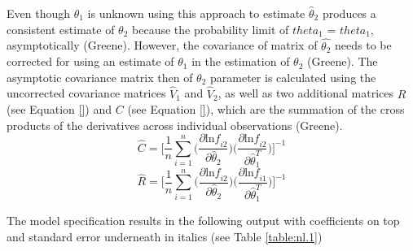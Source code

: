 \documentclass[10pt]{amsart}
\begin{document}
Even though $\theta_1$ is unknown using this approach to estimate $\hat{\theta}_2$ produces a consistent estimate of $\theta_2$ because the probability limit of $\hat{theta}_1$ = $theta_1$, asymptotically \parencite{}(Greene). 
However, the covariance of matrix of $\hat{\theta_2}$ needs to be corrected for using an estimate of $\theta_1$ in the estimation of $\theta_2$ \parencite{}(Greene). 
The asymptotic covariance matrix then of $\theta_2$ parameter is calculated using the uncorrected covariance matrices $\hat{V}_1$ and $\hat{V}_2$, as well as two additional matrices $R$ (see Equation \ref{}) and $C$ (see Equation \ref{}), which are the summation of the cross products of the derivatives across individual observations \parencite{}(Greene).
\begin{equation}
\hat{C} = \bigg[\frac{1}{n}\sum_{i=1}^n \bigg(\frac{\partial\text{ln}\textit{f}_{i2}}{\partial\hat{\theta}_2}\bigg)\bigg(\frac{\partial\text{ln}\textit{f}_{i2}}{\partial\hat{\theta}_1^T}\bigg)\bigg]^{-1}
\end{equation}
\begin{equation}
\hat{R} = \bigg[\frac{1}{n}\sum_{i=1}^n \bigg(\frac{\partial\text{ln}\textit{f}_{i2}}{\partial\hat{\theta}_2}\bigg)\bigg(\frac{\partial\text{ln}\textit{f}_{i1}}{\partial\hat{\theta}_1^T}\bigg)\bigg]^{-1}
\end{equation}

The model specification results in the following output with coefficients on top and standard error underneath in italics (see Table \ref{table:nl.1})
\end{document}
